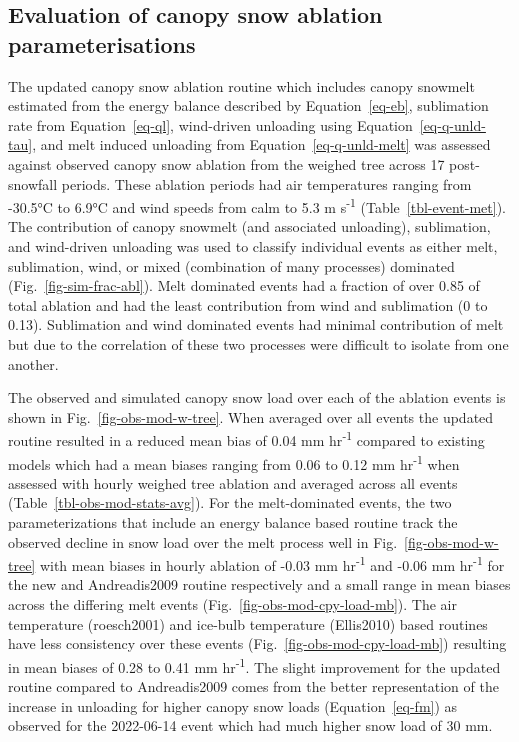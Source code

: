 \documentclass[
  letterpaper,
  DIV=11,
  numbers=noendperiod]{scrartcl}
\begin{document}
\subsection{Evaluation of canopy snow ablation
parameterisations}\label{evaluation-of-canopy-snow-ablation-parameterisations}

The updated canopy snow ablation routine which includes canopy snowmelt
estimated from the energy balance described by Equation~\ref{eq-eb},
sublimation rate from Equation~\ref{eq-ql}, wind-driven unloading using
Equation~\ref{eq-q-unld-tau}, and melt induced unloading from
Equation~\ref{eq-q-unld-melt} was assessed against observed canopy snow
ablation from the weighed tree across 17 post-snowfall periods. These
ablation periods had air temperatures ranging from -30.5°C to 6.9°C and
wind speeds from calm to 5.3 m s\textsuperscript{-1}
(Table~\ref{tbl-event-met}). The contribution of canopy snowmelt (and
associated unloading), sublimation, and wind-driven unloading was used
to classify individual events as either melt, sublimation, wind, or
mixed (combination of many processes) dominated
(Fig.~\ref{fig-sim-frac-abl}). Melt dominated events had a fraction of
over 0.85 of total ablation and had the least contribution from wind and
sublimation (0 to 0.13). Sublimation and wind dominated events had
minimal contribution of melt but due to the correlation of these two
processes were difficult to isolate from one another.

The observed and simulated canopy snow load over each of the ablation
events is shown in Fig.~\ref{fig-obs-mod-w-tree}. When averaged over all
events the updated routine resulted in a reduced mean bias of 0.04 mm
hr\textsuperscript{-1} compared to existing models which had a mean
biases ranging from 0.06 to 0.12 mm hr\textsuperscript{-1} when assessed
with hourly weighed tree ablation and averaged across all events
(Table~\ref{tbl-obs-mod-stats-avg}). For the melt-dominated events, the
two parameterizations that include an energy balance based routine track
the observed decline in snow load over the melt process well in
Fig.~\ref{fig-obs-mod-w-tree} with mean biases in hourly ablation of
-0.03 mm hr\textsuperscript{-1} and -0.06 mm hr\textsuperscript{-1} for
the new and Andreadis2009 routine respectively and a small range in mean
biases across the differing melt events
(Fig.~\ref{fig-obs-mod-cpy-load-mb}). The air temperature (roesch2001)
and ice-bulb temperature (Ellis2010) based routines have less
consistency over these events (Fig.~\ref{fig-obs-mod-cpy-load-mb})
resulting in mean biases of 0.28 to 0.41 mm hr\textsuperscript{-1}. The
slight improvement for the updated routine compared to Andreadis2009
comes from the better representation of the increase in unloading for
higher canopy snow loads (Equation~\ref{eq-fm}) as observed for the
2022-06-14 event which had much higher snow load of 30 mm.
\end{document}
